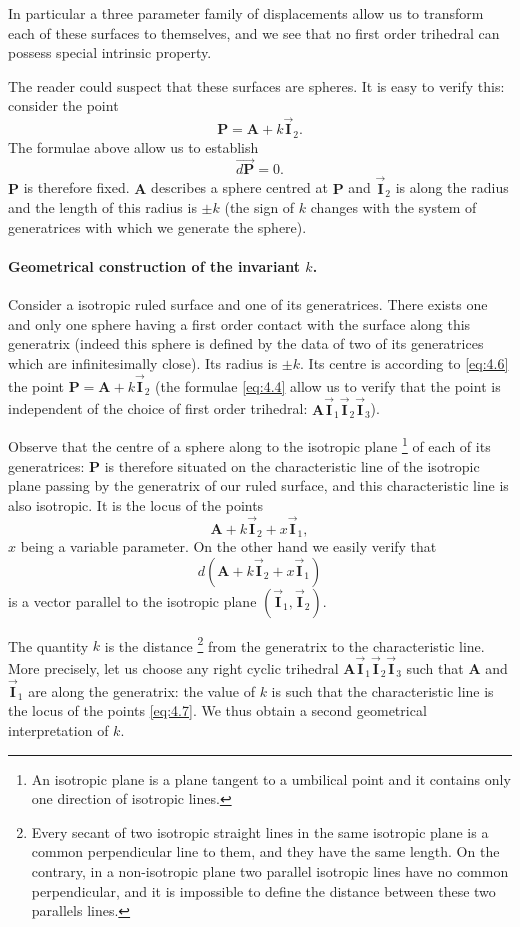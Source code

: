 \documentclass[leqno,11pt]{book}
\numberwithin{equation}{chapter}
\theoremstyle{shape1}
\theoremstyle{shapesmall}
\newcommand{\rvec}[1]{\vec{\mathbf{#1}}}
\newcommand{\ivec}{\rvec{I}}
\begin{document}
In particular a three parameter family of displacements allow us to transform each of these surfaces to themselves, and we see that no first order trihedral can possess special intrinsic property.

The reader could suspect that these surfaces are spheres. It is easy to verify this: consider the point
\begin{equation}
  \label{eq:4.6}
  \mathbf{P}=\mathbf{A}+k\ivec_{2}.
\end{equation}
The formulae above allow us to establish
\[
\overrightarrow{d\mathbf{P}}=0.
\]
$\mathbf{P}$ is therefore fixed. $\mathbf{A}$ describes a sphere centred at $\mathbf{P}$ and $\ivec_{2}$ is along the radius and the length of this radius is $\pm k$ (the sign of $k$ changes with the system of generatrices with which we generate the sphere).

\paragraph{Geometrical construction of the invariant $k$.}
\label{sec:52}

Consider a isotropic ruled surface and one of its generatrices. There exists one and only one sphere having a first order contact with the surface along this generatrix (indeed this sphere is defined by the data of two of its generatrices which are infinitesimally close). Its radius is $\pm k$. Its centre is according to \eqref{eq:4.6} the point $\mathbf{P}=\mathbf{A}+k\ivec_{2}$ (the formulae \eqref{eq:4.4} allow us to verify that the point is independent of the choice of first order trihedral: $\mathbf{A}\ivec_{1}\ivec_{2}\ivec_{3}$).

Observe that the centre of a sphere along to the isotropic plane \footnote{An isotropic plane is a plane tangent to a umbilical point and it contains only one direction of isotropic lines.} of each of its generatrices: $\mathbf{P}$ is therefore situated on the characteristic line of the isotropic plane passing by the generatrix of our ruled surface, and this characteristic line is also isotropic. It is the locus of the points
\begin{equation}
  \label{eq:4.7}
  \mathbf{A}+k\ivec_{2}+x\ivec_{1},
\end{equation}
$x$ being a variable parameter. On the other hand we easily verify that
\[
d(\mathbf{A}+k\ivec_{2}+x\ivec_{1})
\]
is a vector parallel to the isotropic plane $(\ivec_{1},\ivec_{2})$.

The quantity $k$ is the distance \footnote{Every secant of two isotropic straight lines in the same isotropic plane is a common perpendicular line to them, and they have the same length. On the contrary, in a non-isotropic plane two parallel isotropic lines have no common perpendicular, and it is impossible to define the distance between these two parallels lines.} from the generatrix to the characteristic line. More precisely, let us choose any right cyclic trihedral $\mathbf{A}\ivec_{1}\ivec_{2}\ivec_{3}$ such that $\mathbf{A}$ and $\ivec_{1}$ are along the generatrix: the value of $k$ is such that the characteristic line is the locus of the points \eqref{eq:4.7}. We thus obtain a second geometrical interpretation of $k$.
\end{document}
